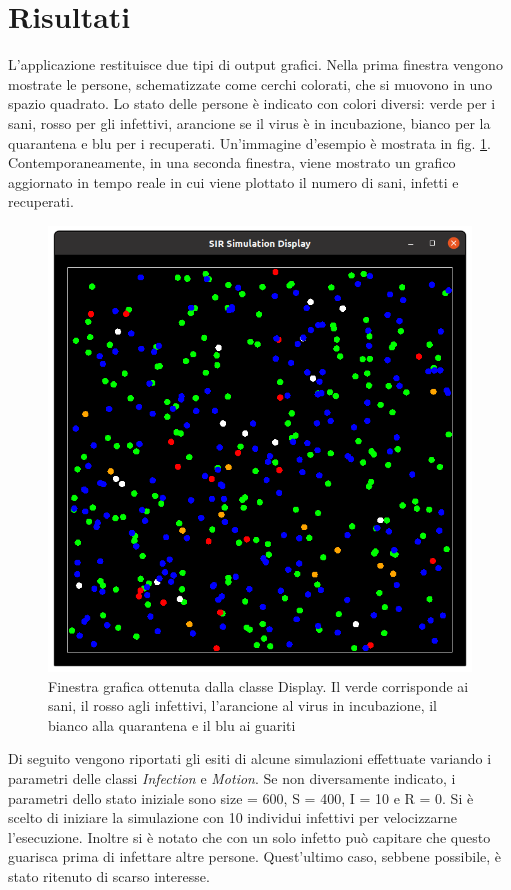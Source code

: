 \documentclass[a4paper,10pt,twocolumn]{article}
\begin{document}
\section{Risultati}
\label{sec:risultati}
L'applicazione restituisce due tipi di output grafici. Nella prima finestra vengono mostrate le persone, schematizzate come cerchi colorati, che si muovono in uno spazio quadrato. Lo stato delle persone è indicato con colori diversi: verde per i sani, rosso per gli infettivi, arancione se il virus è in incubazione, bianco per la quarantena e blu per i recuperati. Un'immagine d'esempio è mostrata in fig. \ref{fig:display}. Contemporaneamente, in una seconda finestra, viene mostrato un grafico aggiornato in tempo reale in cui viene plottato il numero di sani, infetti e recuperati.

\begin{figure}
    \includegraphics[width=\linewidth]{images/display.png}
    \caption{Finestra grafica ottenuta dalla classe Display. Il verde corrisponde ai sani, il rosso agli infettivi, l'arancione al virus in incubazione, il bianco alla quarantena e il blu ai guariti}
    \label{fig:display}
\end{figure}

Di seguito vengono riportati gli esiti di alcune simulazioni effettuate variando i parametri delle classi \emph{Infection} e \emph{Motion}. Se non diversamente indicato, i parametri  dello stato iniziale sono size = 600, S = 400, I = 10 e  R = 0. Si è scelto di iniziare la simulazione con 10 individui infettivi per velocizzarne l'esecuzione. Inoltre si è notato che  con un solo infetto può capitare che questo guarisca prima di infettare altre persone. Quest'ultimo caso, sebbene possibile, è stato ritenuto di scarso interesse.
\end{document}
